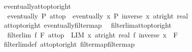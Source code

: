 \begin{isabellebody}
%
\endisatagproof
{\isafoldproof}%
%
\isadelimproof
\isanewline
%
\endisadelimproof
\isanewline
{}\isamarkupfalse%
\ eventually{\isacharunderscore}{\kern0pt}at{\isacharunderscore}{\kern0pt}top{\isacharunderscore}{\kern0pt}to{\isacharunderscore}{\kern0pt}right{\isacharcolon}{\kern0pt}\isanewline
\ \ {\isachardoublequoteopen}eventually\ P\ at{\isacharunderscore}{\kern0pt}top\ {\isasymlongleftrightarrow}\ eventually\ {\isacharparenleft}{\kern0pt}{\isasymlambda}x{\isachardot}{\kern0pt}\ P\ {\isacharparenleft}{\kern0pt}inverse\ x{\isacharparenright}{\kern0pt}{\isacharparenright}{\kern0pt}\ {\isacharparenleft}{\kern0pt}at{\isacharunderscore}{\kern0pt}right\ {\isacharparenleft}{\kern0pt}{}{\isacharcolon}{\kern0pt}{\isacharcolon}{\kern0pt}real{\isacharparenright}{\kern0pt}{\isacharparenright}{\kern0pt}{\isachardoublequoteclose}\isanewline
%
\isadelimproof
\ \ %
\endisadelimproof
%
\isatagproof
{}\isamarkupfalse%
\ at{\isacharunderscore}{\kern0pt}top{\isacharunderscore}{\kern0pt}to{\isacharunderscore}{\kern0pt}right\ eventually{\isacharunderscore}{\kern0pt}filtermap\ \isacommand{{\isachardot}{\kern0pt}{\isachardot}{\kern0pt}}\isamarkupfalse%
%
\endisatagproof
{\isafoldproof}%
%
\isadelimproof
\isanewline
%
\endisadelimproof
\isanewline
{}\isamarkupfalse%
\ filterlim{\isacharunderscore}{\kern0pt}at{\isacharunderscore}{\kern0pt}top{\isacharunderscore}{\kern0pt}to{\isacharunderscore}{\kern0pt}right{\isacharcolon}{\kern0pt}\isanewline
\ \ {\isachardoublequoteopen}filterlim\ f\ F\ at{\isacharunderscore}{\kern0pt}top\ {\isasymlongleftrightarrow}\ {\isacharparenleft}{\kern0pt}LIM\ x\ {\isacharparenleft}{\kern0pt}at{\isacharunderscore}{\kern0pt}right\ {\isacharparenleft}{\kern0pt}{}{\isacharcolon}{\kern0pt}{\isacharcolon}{\kern0pt}real{\isacharparenright}{\kern0pt}{\isacharparenright}{\kern0pt}{\isachardot}{\kern0pt}\ f\ {\isacharparenleft}{\kern0pt}inverse\ x{\isacharparenright}{\kern0pt}\ {\isacharcolon}{\kern0pt}{\isachargreater}{\kern0pt}\ F{\isacharparenright}{\kern0pt}{\isachardoublequoteclose}\isanewline
%
\isadelimproof
\ \ %
\endisadelimproof
%
\isatagproof
{}\isamarkupfalse%
\ filterlim{\isacharunderscore}{\kern0pt}def\ at{\isacharunderscore}{\kern0pt}top{\isacharunderscore}{\kern0pt}to{\isacharunderscore}{\kern0pt}right\ filtermap{\isacharunderscore}{\kern0pt}filtermap\ \isacommand{{\isachardot}{\kern0pt}{\isachardot}{\kern0pt}}\isamarkupfalse%
%
\endisatagproof
{\isafoldproof}%
%
\isadelimproof
\isanewline
%
\endisadelimproof
\isanewline
{}\isamarkupfalse%

\end{isabellebody}
